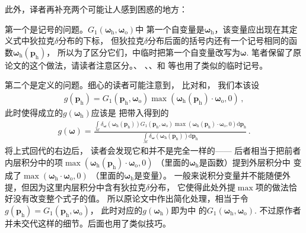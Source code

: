 此外，译者再补充两个可能让人感到困惑的地方：

第一个是记号的问题。$G_1({\bm\omega}_{\mathrm{h}},{\bm\omega}_{\mathrm{o}})$中
第一个自变量是${\bm\omega}_{\mathrm{h}}$，该变量应出现在其定义式中狄拉克$\delta$分布的下标，
但狄拉克$\delta$分布后面的括号内还有一个记号相同的函数${\bm\omega}_{\mathrm{h}}({\bm p}_{\mathrm{h}})$，
所以为了区分它们，中临时把第一个自变量改写为${\bm\omega}$.
笔者保留了原论文的这个做法，请读者注意区分。、
、、和
等也用了类似的临时记号。

第二个是定义的问题。细心的读者可能注意到，
比对和，
我们本该设
\begin{align}\label{eq:08ex01-AnotherSpaceFunc}
    g({\bm p}_{\mathrm{h}})=G_1({\bm p}_{\mathrm{h}},{\bm\omega}_{\mathrm{o}})
    \max({\bm\omega}_{\mathrm{h}}({\bm p}_{\mathrm{h}})\cdot{\bm\omega}_{\mathrm{o}},0)\, ,
\end{align}
此时使得成立的$g({\bm\omega}_{\mathrm{h}})$应该是
把带入得到的
\begin{align}\label{eq:08ex01-AnotherStaticFunc}
    g({\bm\omega})=\frac{\displaystyle\int\limits_{\mathcal{M}}
    \delta_{\bm\omega}({\bm\omega}_{\mathrm{h}}({\bm p}_{\mathrm{h}}))
    G_1({\bm p}_{\mathrm{h}},{\bm\omega}_{\mathrm{o}})
    \max({\bm\omega}_{\mathrm{h}}({\bm p}_{\mathrm{h}})\cdot{\bm\omega}_{\mathrm{o}},0)
    \mathrm{d}{\bm p}_{\mathrm{h}}}
    {\displaystyle\int\limits_{\mathcal{M}}
    \delta_{\bm\omega}({\bm\omega}_{\mathrm{h}}({\bm p}_{\mathrm{h}}))
    \mathrm{d}{\bm p}_{\mathrm{h}}}\, .
\end{align}
将上式回代的右边后，
读者会发现它和并不是完全一样的——
后者相当于把前者内层积分中的项$\max({\bm\omega}_{\mathrm{h}}({\bm p}_{\mathrm{h}})\cdot{\bm\omega}_{\mathrm{o}},0)$
（里面的${\bm\omega}_{\mathrm{h}}$是函数）提到外层积分中
变成了$\max({\bm\omega}_{\mathrm{h}}\cdot{\bm\omega}_{\mathrm{o}},0)$
（里面的${\bm\omega}_{\mathrm{h}}$是变量）。
一般来说积分变量并不能随便外提，但因为这里内层积分中含有狄拉克$\delta$分布，
它使得此处外提$\max$项的做法恰好没有改变整个式子的值。
所以原论文中作出简化处理，相当于令$g({\bm p}_{\mathrm{h}})=G_1({\bm p}_{\mathrm{h}},{\bm\omega}_{\mathrm{o}})$，
此时对应的$g({\bm\omega}_{\mathrm{h}})$即为中
的$G_1({\bm\omega}_{\mathrm{h}},{\bm\omega}_{\mathrm{o}})$.
不过原作者并未交代这样的细节。后面也用了类似技巧。

